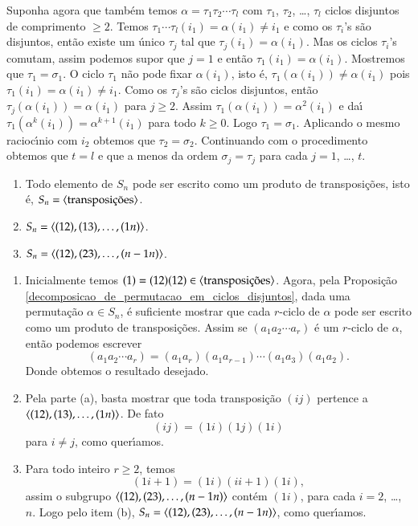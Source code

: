 \begin{prova}
	Suponha agora que tamb\'em temos $\alpha = \tau_1\tau_2\cdots \tau_l$ com $\tau_1$, $\tau_2$, \dots, $\tau_l$ ciclos disjuntos de comprimento $\ge 2$. Temos $\tau_1\cdots \tau_l(i_1) = \alpha(i_1) \ne i_1$ e como os $\tau_i$'s s\~ao disjuntos, ent\~ao existe um \'unico $\tau_j$ tal que $\tau_j(i_1) = \alpha(i_1)$. Mas os ciclos $\tau_i$'s comutam, assim podemos supor que $j = 1$ e ent\~ao $\tau_1(i_1) = \alpha(i_1)$. Mostremos que $\tau_1 = \sigma_1$. O ciclo $\tau_1$ n\~ao pode fixar $\alpha(i_1)$, isto \'e, $\tau_1(\alpha(i_1)) \ne \alpha(i_1)$ pois $\tau_1(i_1) = \alpha(i_1) \ne i_1$. Como os $\tau_j$'s s\~ao ciclos disjuntos, ent\~ao $\tau_j(\alpha(i_1)) = \alpha(i_1)$ para $j \ge 2$. Assim $\tau_1(\alpha(i_1)) = \alpha^2(i_1)$ e da{\'\i} $\tau_1(\alpha^k(i_1)) = \alpha^{k + 1}(i_1)$ para todo $k \ge 0$. Logo $\tau_1 = \sigma_1$. Aplicando o mesmo racioc{\'\i}nio com $i_2$ obtemos que $\tau_2 = \sigma_2$. Continuando com o procedimento obtemos que $t = l$ e que a menos da ordem $\sigma_j = \tau_j$ para cada $j = 1$, \dots, $t$.
\end{prova}

\begin{proposicao}
	\begin{enumerate}[label=({\roman*})]
		\item Todo elemento de $S_n$ pode ser escrito como um produto de transposi\c{c}\~oes, isto \'e, $S_n = \ger{\mbox{transposi\c{c}\~oes}}$.

		\item $S_n = \langle{(12), (13), \dots, (1n)}\rangle$.

		\item $S_n = \langle{(12), (23), \dots, (n-1 n)}\rangle$.
	\end{enumerate}
\end{proposicao}
\begin{prova}
	\begin{enumerate}[label=({\roman*})]
		\item Inicialmente temos $(1) = (12)(12) \in \ger{\mbox{transposi\c{c}\~oes}}$. Agora, pela Proposi\c{c}\~ao \ref{decomposicao_de_permutacao_em_ciclos_disjuntos}, dada uma permuta\c{c}\~ao $\alpha \in S_n$, \'e suficiente mostrar que cada $r$-ciclo de $\alpha$ pode ser escrito como um produto de transposi\c{c}\~oes. Assim se $(a_1 a_2 \cdots a_r)$ \'e um $r$-ciclo de $\alpha$, ent\~ao podemos escrever
		\[
			(a_1 a_2 \cdots a_r) = (a_1 a_r)(a_1 a_{r - 1})\cdots (a_1 a_3)(a_1 a_2).
		\]
		Donde obtemos o resultado desejado.

		\item Pela parte (a), basta mostrar que toda transposi\c{c}\~ao $(i j)$ pertence a $\langle{(12), (13), \dots, (1n)}\rangle$. De fato
		\[
			(i j) = (1 i)(1 j)(1 i)
		\]
		para $i \ne j$, como quer{\'\i}amos.

		\item Para todo inteiro $r \ge 2$, temos
		\[
			(1 i+1) = (1 i)(i i+1)(1 i),
		\]
		assim o subgrupo $\langle{(12), (23), \dots, (n-1 n)}\rangle$ cont\'em $(1 i)$, para cada $i = 2$, \dots, $n$. Logo pelo item (b), $S_n = \langle{(12), (23), \dots, (n-1 n)}\rangle$, como quer{\'\i}amos.
	\end{enumerate}
\end{prova}

